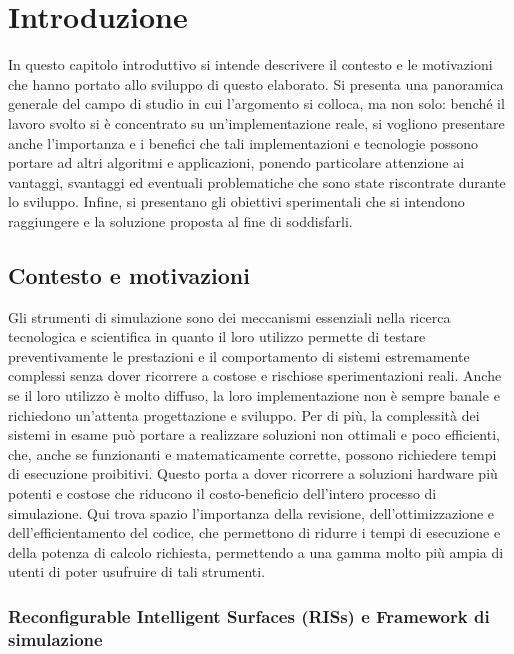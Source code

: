 \chapter{Introduzione}
\label{ch:introduzione}

In questo capitolo introduttivo si intende descrivere il contesto e le
motivazioni che hanno portato allo sviluppo di questo elaborato. Si presenta una
panoramica generale del campo di studio in cui l'argomento si colloca, ma non
solo: benché il lavoro svolto si è concentrato su un'implementazione reale, si
vogliono presentare anche l'importanza e i benefici che tali implementazioni e
tecnologie possono portare ad altri algoritmi e applicazioni, ponendo particolare
attenzione ai vantaggi, svantaggi ed eventuali problematiche che sono state
riscontrate durante lo sviluppo. Infine, si presentano gli obiettivi
sperimentali che si intendono raggiungere e la soluzione proposta al fine di
soddisfarli.

\section{Contesto e motivazioni}
\label{sec:contesto}

Gli strumenti di simulazione sono dei meccanismi essenziali nella ricerca tecnologica
e scientifica in quanto il loro utilizzo permette di testare preventivamente le prestazioni
e il comportamento di sistemi estremamente complessi senza dover ricorrere a costose
e rischiose sperimentazioni reali. Anche se il loro utilizzo è molto diffuso, la
loro implementazione non è sempre banale e richiedono un'attenta progettazione e
sviluppo. Per di più, la complessità dei sistemi in esame può portare a realizzare
soluzioni non ottimali e poco efficienti, che, anche se funzionanti e matematicamente
corrette, possono richiedere tempi di esecuzione proibitivi. Questo porta a dover
ricorrere a soluzioni hardware più potenti e costose che riducono il costo-beneficio
dell'intero processo di simulazione. Qui trova spazio l'importanza della
revisione, dell'ottimizzazione e dell'efficientamento del codice, che permettono
di ridurre i tempi di esecuzione e della potenza di calcolo richiesta, permettendo
a una gamma molto più ampia di utenti di poter usufruire di tali strumenti.

\subsection{Reconfigurable Intelligent Surfaces (RISs) e Framework di
simulazione}
\label{subsec:risframework}

